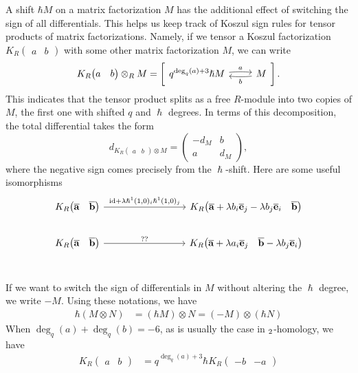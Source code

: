 \documentclass{article}
\newcommand{\DD}{\mathcal{D}}
\newcommand{\id}{\mathrm{id}}
\newcommand{\mfshort}[4]{%
  \begin{tikzcd}[ampersand replacement=\&]
    {#1} \arrow[r, "#3", bend left=5,start anchor=east, end anchor=west, shift left=2pt]  \& 
    {#2} \arrow[l,"#4", bend left=5, start anchor=west, end anchor=east, shift left=2pt]
  \end{tikzcd}%
}
\newcommand{\kmf}[2]{
	K_{#1}{\begin{pmatrix}
			#2
		\end{pmatrix}
	}	
}
\newcommand{\skmf}[2]{
	K_{#1}{\left(\begin{smallmatrix}
			#2
		\end{smallmatrix}\right)
	}	
}
\theoremstyle{plain} %
\theoremstyle{definition} %
\theoremstyle{remark} %
\begin{document}
A shift $\hbar M$ on a matrix factorization $M$ has the additional effect of switching the sign of all differentials. This helps us keep track of Koszul sign rules for tensor products of matrix factorizations. Namely, if we tensor a Koszul factorization $K_{R}\begin{pmatrix} a & b \end{pmatrix}$ with some other matrix factorization $M$, we can write
$$
	\kmf{R}{a & b }\otimes_R M
	=
	\left[ \mfshort{q^{\deg_q(a)+3}\hslash M}{M}{a}{b} \right]
	.
$$
This indicates that the tensor product splits as a free $R$-module into two copies of $M$, the first one with shifted $q$ and $\hslash$ degrees. In terms of this decomposition, the total differential takes the form 
$$
	d_{\skmf{R}{a & b } \otimes M}  
	=
	\begin{pmatrix}
	   	-d_M & b 
	   	\\ 
	   	a & d_M
	\end{pmatrix}
	,
$$
where the negative sign comes precisely from the $\hslash$-shift. 
Here are some useful isomorphisms
\[
	\begin{tikzcd}[ampersand replacement=\&, column sep=3cm]
		\kmf{R}{\mathbf{\overline a} & \mathbf{\overline b} }  
		\ar[r, "{\id+\lambda \hslash^1(1,0)_i\hslash^1(1,0)_j}"]
		\&
		\kmf{R}{\mathbf{\overline a}+\lambda b_i\mathbf{\overline e}_j-\lambda b_j\mathbf{\overline e}_i &  \mathbf{\overline b} }
		\\
		\kmf{R}{\mathbf{\overline a} & \mathbf{\overline b} }  
		\ar[r, "{??}"]
		\&
		\kmf{R}{\mathbf{\overline a}+\lambda a_i\mathbf{\overline e}_j &  \mathbf{\overline b}-\lambda b_j\mathbf{\overline e}_i }
		\\
	\end{tikzcd}
\]

If we want to switch the sign of differentials in $M$ without altering the $\hslash$ degree, we write $-M$. Using these notations, we have 
\begin{align*}
    \hbar (M\otimes N) 
    &
    = (\hbar M)\otimes N = (-M)\otimes(\hbar N)
\end{align*}
When $\deg_q(a)+\deg_q(b)=-6$, as is usually the case in $\sl_2$-homology, we have
\begin{align*}
    \kmf{R}{a & b} 
    &= q^{\deg_q(a)+3}\hbar \kmf{R}{-b & -a} 
\end{align*}


\end{document}
